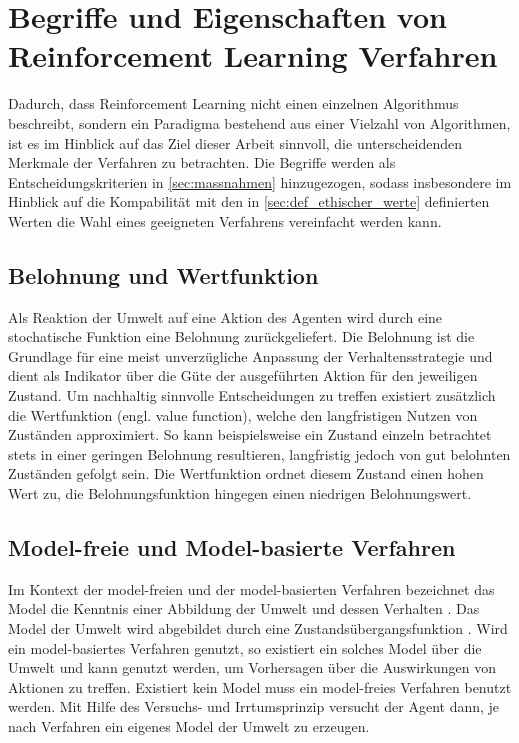 \section{Begriffe und Eigenschaften von Reinforcement Learning Verfahren}\label{sec:eigenschaften_rl}
Dadurch, dass Reinforcement Learning nicht einen einzelnen Algorithmus beschreibt, sondern ein Paradigma bestehend aus einer Vielzahl von Algorithmen, ist es im Hinblick auf das Ziel dieser Arbeit sinnvoll, die unterscheidenden Merkmale der Verfahren zu betrachten.
Die Begriffe werden als Entscheidungskriterien in \autoref{sec:massnahmen} hinzugezogen, sodass insbesondere im Hinblick auf die Kompabilität mit den in \autoref{sec:def_ethischer_werte} definierten Werten die Wahl eines geeigneten Verfahrens vereinfacht werden kann.
\subsection{Belohnung und Wertfunktion}
Als Reaktion der Umwelt auf eine Aktion des Agenten wird durch eine stochatische Funktion \cite[S. 6]{sutton2018} eine Belohnung zurückgeliefert.
Die Belohnung ist die Grundlage für eine meist unverzügliche Anpassung der Verhaltensstrategie und dient als Indikator über die Güte der ausgeführten Aktion für den jeweiligen Zustand.
Um nachhaltig sinnvolle Entscheidungen zu treffen existiert zusätzlich die Wertfunktion (engl. value function), welche den langfristigen Nutzen von Zuständen approximiert.
So kann beispielsweise ein Zustand einzeln betrachtet stets in einer geringen Belohnung resultieren, langfristig jedoch von gut belohnten Zuständen gefolgt sein.
Die Wertfunktion ordnet diesem Zustand einen hohen Wert zu, die Belohnungsfunktion hingegen einen niedrigen Belohnungswert.

\subsection{Model-freie und Model-basierte Verfahren}
Im Kontext der model-freien und der model-basierten Verfahren bezeichnet das Model die Kenntnis einer Abbildung der Umwelt und dessen Verhalten \cite[S. 7]{sutton2018}.
Das Model der Umwelt wird abgebildet durch eine Zustandsübergangsfunktion \cite[S. 14]{li2018}.
Wird ein model-basiertes Verfahren genutzt, so existiert ein solches Model über die Umwelt und kann genutzt werden, um Vorhersagen über die Auswirkungen von Aktionen zu treffen.
Existiert kein Model muss ein model-freies Verfahren benutzt werden.
Mit Hilfe des Versuchs- und Irrtumsprinzip \cite[S. 7]{sutton2018} versucht der Agent dann, je nach Verfahren ein eigenes Model der Umwelt zu erzeugen.

